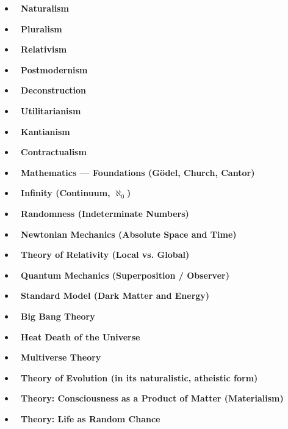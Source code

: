 \documentclass[12pt]{article}
\begin{document}
\begin{itemize}
\item \textbf{🔷 Naturalism}

\item \textbf{🔷 Pluralism}

\item \textbf{🔷 Relativism}

\item \textbf{🔷 Postmodernism}

\item \textbf{🔷 Deconstruction}

\item \textbf{🔷 Utilitarianism}

\item \textbf{🔷 Kantianism}

\item \textbf{🔷 Contractualism}

\item \textbf{🔷 Mathematics — Foundations (Gödel, Church, Cantor)}

\item \textbf{🔷 Infinity (Continuum, $\aleph_0$)}

\item \textbf{🔷 Randomness (Indeterminate Numbers)}

\item \textbf{🔷 Newtonian Mechanics (Absolute Space and Time)}

\item \textbf{🔷 Theory of Relativity (Local vs. Global)}

\item \textbf{🔷 Quantum Mechanics (Superposition / Observer)}

\item \textbf{🔷 Standard Model (Dark Matter and Energy)}

\item \textbf{🔷 Big Bang Theory}

\item \textbf{🔷 Heat Death of the Universe}

\item \textbf{🔷 Multiverse Theory}

\item \textbf{🔷 Theory of Evolution (in its naturalistic, atheistic form)}

\item \textbf{🔷 Theory: Consciousness as a Product of Matter (Materialism)}

\item \textbf{🔷 Theory: Life as Random Chance}


\end{itemize}
\end{document}
